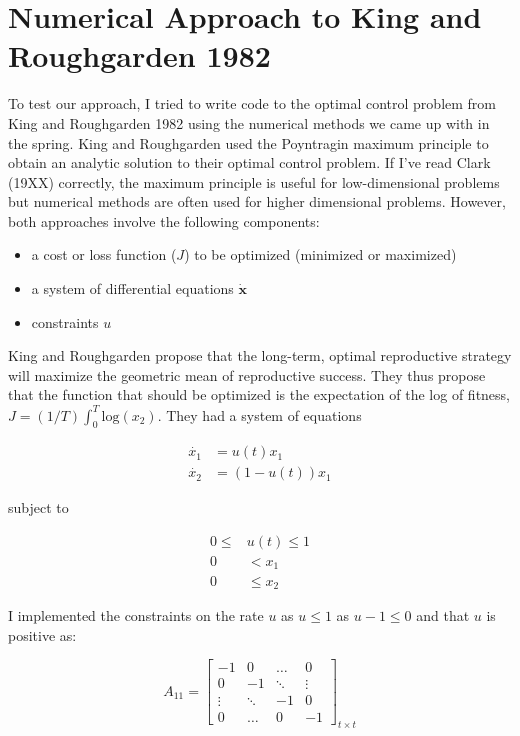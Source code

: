 \documentclass[12pt, oneside]{article}   	%
\begin{document}
 

\section*{Numerical Approach to King and Roughgarden 1982}

\noindent To test our approach, I tried to write code to the optimal control problem from King and Roughgarden 1982 using the numerical methods we came up with in the spring. King and Roughgarden used the Poyntragin maximum principle to obtain an analytic solution to their optimal control problem. If I've read Clark (19XX) correctly, the maximum principle is useful for low-dimensional problems but numerical methods are often used for higher dimensional problems. However, both approaches involve the following components:

\begin{itemize}
\item a cost or loss function ($J$) to be optimized (minimized or maximized)

\item a system of differential equations $\dot{\bm{x}}$

\item constraints $u$

\end{itemize}

\noindent King and Roughgarden propose that the long-term, optimal reproductive strategy will maximize the geometric mean of reproductive success. They thus propose that the function that should be optimized is the expectation of the log of fitness, $ J = (1/T) \int_{0}^{T} \mathrm{log}(x_2)$. They had a system of equations 

\begin{align}
\dot{x_1} & = u(t) x_1 \nonumber \\
\dot{x_2} & = (1-u(t)) x_1 
\end{align}

\noindent subject to

\begin{align}
0 \leq & u(t) \leq 1 \nonumber \\
0 & < x_1 \nonumber \\
0 & \leq x_2
\end{align}

\noindent I implemented the constraints on the rate $u$ as $  u  \leq 1 $ as $ u - 1 \leq 0 $ and that $u$ is positive as:

\begin{equation}
A_{11}=
  \begin{bmatrix}
    -1		& 0 	 	& \ldots 	& 0  	 \\
    0 	 	& -1  	& \ddots 	& \vdots  \\
    \vdots   & \ddots 	& -1		& 0  \\
    0 		& \ldots 	& 0 		& -1  
  \end{bmatrix}_{ t \times t}
\end{equation}
 
\end{document}
